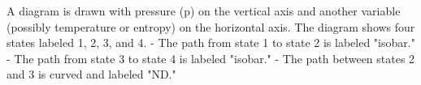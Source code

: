 A diagram is drawn with pressure (p) on the vertical axis and another variable (possibly temperature or entropy) on the horizontal axis. The diagram shows four states labeled 1, 2, 3, and 4.  
- The path from state 1 to state 2 is labeled "isobar."  
- The path from state 3 to state 4 is labeled "isobar."  
- The path between states 2 and 3 is curved and labeled "ND."